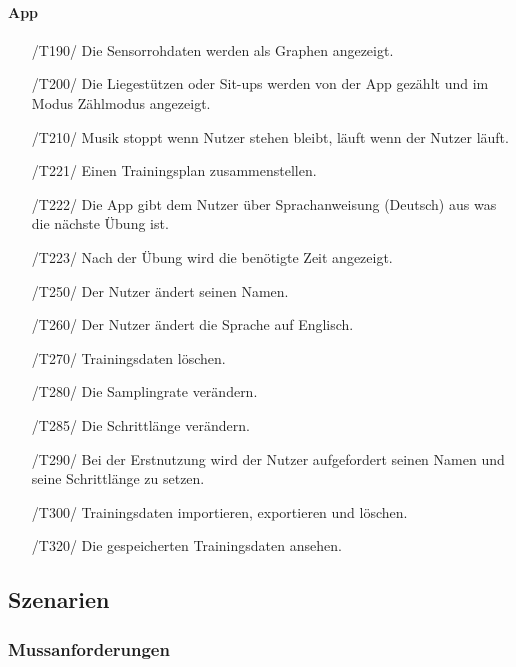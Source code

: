 \documentclass[a4paper,12pt]{article}
\begin{document}
  \paragraph{App}
  \begin{itemize}
    \item[/T190/] Die Sensorrohdaten werden als Graphen angezeigt.
    \item[/T200/] Die Liegestützen oder Sit-ups werden von der App gezählt und im Modus \glqq{}Zählmodus \grqq{} angezeigt.
    \item[/T210/] Musik stoppt wenn Nutzer stehen bleibt, läuft wenn der Nutzer läuft.
    \item[/T221/] Einen Trainingsplan zusammenstellen.
    \item[/T222/] Die App gibt dem Nutzer über Sprachanweisung (Deutsch) aus was die nächste Übung ist.
    \item[/T223/] Nach der Übung wird die benötigte Zeit angezeigt.
    \item[/T250/] Der Nutzer ändert seinen Namen.
    \item[/T260/] Der Nutzer ändert die Sprache auf Englisch.
    \item[/T270/] Trainingsdaten löschen.
    \item[/T280/] Die Samplingrate verändern.
    \item[/T285/] Die Schrittlänge verändern.
    \item[/T290/] Bei der Erstnutzung wird der Nutzer aufgefordert seinen Namen und seine Schrittlänge zu setzen.
    \item[/T300/] Trainingsdaten importieren, exportieren und löschen.
    \item[/T320/] Die gespeicherten Trainingsdaten ansehen.
   \end{itemize}
   
  \subsection{Szenarien}
    \subsubsection{Mussanforderungen}
\end{document}
